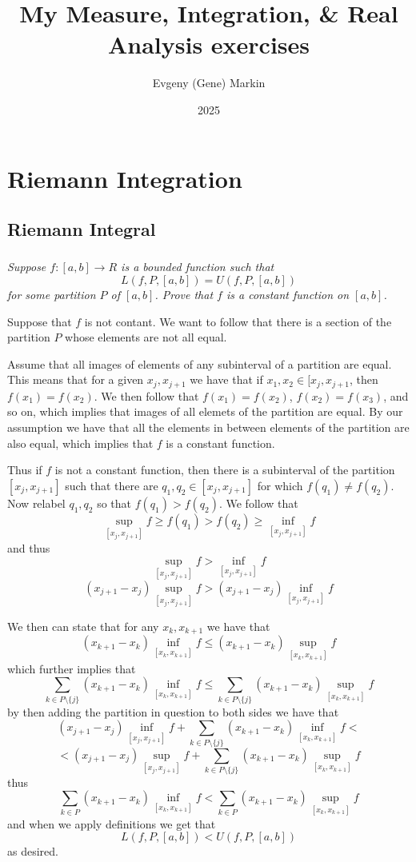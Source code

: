 \documentclass[11pt,oneside,titlepage]{book}
\title{My Measure, Integration, \& Real Analysis exercises}
\author{Evgeny (Gene) Markin}
\date{2025}
\newcommand{\set}[1]{\{ #1 \}}
\begin{document}
\maketitle
\tableofcontents


\chapter{Riemann Integration}

\section{Riemann Integral}

\subsection{}

\textit{Suppose $f: [a, b] \to R$ is a bounded function such that
  $$L(f, P, [a, b]) = U(f, P, [a, b])$$
  for some partition $P$ of $[a, b]$. Prove that $f$ is a constant
  function on $[a, b]$.}

Suppose that $f$ is not contant. We want to follow that there is a
section of the partition $P$ whose elements are not all equal.

Assume that all images of elements of any subinterval of a partition
are equal. This means that for a given $x_j, x_{j + 1}$ we have that
if $x_1, x_2 \in [x_j, x_{j + 1}$, then $f(x_1) = f(x_2)$. We then
follow that $f(x_1) = f(x_2)$, $f(x_2) = f(x_3)$, and so on, which
implies that images of all elemets of the partition are equal. By our
assumption we have that all the elements in between elements of the
partition are also equal, which implies that $f$ is a constant
function.

Thus if $f$ is not a constant function, then there is a
subinterval of the partition $[x_j, x_{j + 1}]$ such that there are
$q_1, q_2 \in [x_j, x_{j + 1}]$ for which $f(q_1) \neq f(q_2)$.
Now relabel $q_1, q_2$ so that $f(q_1) > f(q_2)$. We follow that
$$\sup_{[x_j, x_{j + 1}]} f \geq f(q_1) > f(q_2) \geq \inf_{[x_j, x_{j + 1}]} f $$
and thus
$$\sup_{[x_j, x_{j + 1}]} f >  \inf_{[x_j, x_{j + 1}]} f $$
$$(x_{j + 1} - x_j) \sup_{[x_j, x_{j + 1}]} f >  (x_{j + 1} - x_j)  \inf_{[x_j, x_{j + 1}]} f $$

We then can state that for any $x_k, x_{k +1}$ we have that
$$(x_{k + 1} - x_k) \inf_{[x_k, x_{k +1}]} f
\leq (x_{k + 1} - x_k) \sup_{[x_k, x_{k +1}]} f$$
which further implies that
$$\sum_{k \in P \setminus \set{j}}(x_{k + 1} - x_k) \inf_{[x_k, x_{k +1}]} f
\leq \sum_{k \in P \setminus \set{j}} (x_{k + 1} - x_k) \sup_{[x_k, x_{k +1}]} f$$
by then adding the partition in question to both sides we have that
$$(x_{j + 1} - x_j)  \inf_{[x_j, x_{j + 1}]} f  +
\sum_{k \in P \setminus \set{j}}(x_{k + 1} - x_k) \inf_{[x_k, x_{k +1}]} f
<$$
$$ < (x_{j + 1} - x_j)  \sup_{[x_j, x_{j + 1}]} f  +
\sum_{k \in P \setminus \set{j}} (x_{k + 1} - x_k) \sup_{[x_k, x_{k +1}]} f$$
thus
$$
\sum_{k \in P}(x_{k + 1} - x_k) \inf_{[x_k, x_{k +1}]} f
< \sum_{k \in P} (x_{k + 1} - x_k) \sup_{[x_k, x_{k +1}]} f$$
and when we apply definitions we get that
$$L(f, P, [a, b]) < U(f, P, [a, b])$$
as desired.
\end{document}

